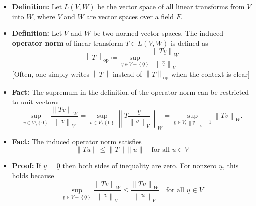 \documentclass[11pt,twoside]{report}
\newcommand{\vecnot}{\underline}
\begin{document}
\begin{itemize}

\item \textbf{Definition:} Let $L(V,W)$ be the vector space of all linear transforms from $V$ into $W$, where $V$ and $W$ are vector spaces over a field $F$.

\item \textbf{Definition:} Let $V$ and $W$ be two normed vector spaces. The  induced \textbf{operator norm} of linear transform $T \in L(V,W)$ is defined as
\begin{equation*}
\left\| T \right\|_{\mathrm{op}}
\coloneqq  \sup_{ \vecnot{v} \in V -  \left\{ \vecnot{0} \right\} }
\frac{ \left\| T \vecnot{v} \right\|_W }{ \left\| \vecnot{v} \right\|_V }
\end{equation*}
[Often, one simply writes $\left\| T \right\|$ instead of $\left\| T \right\|_{\mathrm{op}}$ when the context is clear] 

\item \textbf{Fact:} The supremum in the definition of the operator norm can be restricted to unit vectors: 
\begin{equation*}
 \sup_{ \vecnot{v} \in V \setminus \left\{ \vecnot{0} \right\} }
\frac{ \left\| T \vecnot{v} \right\|_W }{ \left\| \vecnot{v} \right\|_V } =  \sup_{ \vecnot{v} \in V \setminus \left\{ \vecnot{0} \right\} }
\left\| T \frac{  \vecnot{v}}{ \left\| \vecnot{v} \right\|_V } \right\|_W 
= \sup_{\vecnot{v} \in V, \left\| \vecnot{v} \right\|_V = 1 }
\left\| T \vecnot{v} \right\|_W .
\end{equation*}


\item \textbf{Fact:} The induced operator norm satisfies
\[
\| T \vecnot{u} \| \le \| T \| \| \vecnot{u} \| \quad \text{for all $\vecnot{u} \in V$}
\]
\item \textbf{Proof:}  If $\vecnot{u} = \vecnot{0}$ then both sides of inequality are zero. For nonzero $\vecnot{u}$, this holds because
\[
 \sup_{ \vecnot{v} \in V - \left\{ \vecnot{0} \right\} }
\frac{ \left\| T \vecnot{v} \right\|_W }{ \left\| \vecnot{v} \right\|_V } \le \frac{ \left\| T \vecnot{u} \right\|_W }{ \left\| \vecnot{u} \right\|_V } \quad \text{for all $\vecnot{u} \in V$}
\]


\end{itemize}
\end{document}
